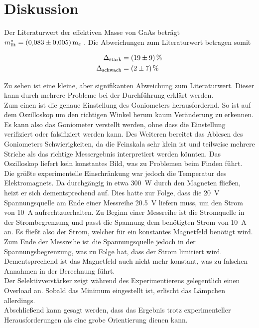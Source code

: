 


\section{Diskussion}
\label{sec:Diskussion}

%
Der Literaturwert der effektiven Masse von GaAs beträgt $m^*_\text{lit}=\qty{0.083\pm0.005}m_e$ \cite{v46_paper}.
%
%
Die Abweichungen zum Literaturwert betragen somit


%
\begin{align*}
    \Delta_\text{stark} &= \qty{19\pm9}{\percent}\\
    \Delta_\text{schwach} &= \qty{2\pm7}{\percent}\\
\end{align*}

\noindent Zu sehen ist eine kleine, aber signifikanten Abweichung zum Literaturwert. Dieser kann durch mehrere Probleme bei der Durchführung erklärt werden.\\
\noindent Zum einen ist die genaue Einstellung des Goniometers herausfordernd. So ist auf dem Oszilloskop um den richtigen Winkel herum kaum Veränderung zu 
erkennen. Es kann also das Goniometer verstellt werden, ohne dass die Einstellung verifiziert oder falsifiziert werden kann. Des Weiteren bereitet das 
Ablesen des Goniometers Schwierigkeiten, da die Feinskala sehr klein ist und teilweise mehrere Striche als das richtige Messergebnis interpretiert werden 
könnten. Das Oszilloskop liefert kein konstantes Bild, was zu Problemen beim Finden führt. \\
Die größte experimentelle Einschränkung war jedoch die Temperatur des Elektromagnets. Da durchgängig in etwa \qty{300}{\watt} durch den Magneten fließen, 
heizt er sich dementsprechend auf. Dies hatte zur Folge, dass die \qty{20}{\volt} Spannungsquelle am Ende einer Messreihe \qty{20.5}{\volt} 
liefern muss, um den Strom von \qty{10}{\ampere} aufrechtzuerhalten. Zu Beginn einer Messreihe ist die Stromquelle in der Strombegrenzung und passt die 
Spannung dem benötigten Strom von \qty{10}{\ampere} an. Es fließt also der Strom, welcher für ein konstantes Magnetfeld benötigt wird. Zum Ende der 
Messreihe ist die Spannungsquelle jedoch in der Spannungsbegrenzung, was zu Folge hat, dass der Strom limitiert wird. Dementsprechend ist das 
Magnetfeld auch nicht mehr konstant, was zu falschen Annahmen in der Berechnung führt.\\
Der Selektivverstärker zeigt während des Experimentierens gelegentlich einen Overload an. Sobald das Minimum eingestellt ist, erlischt das 
Lämpchen allerdings.\\
Abschließend kann gesagt werden, dass das Ergebnis trotz experimenteller Herausforderungen als eine grobe Orientierung dienen kann.


